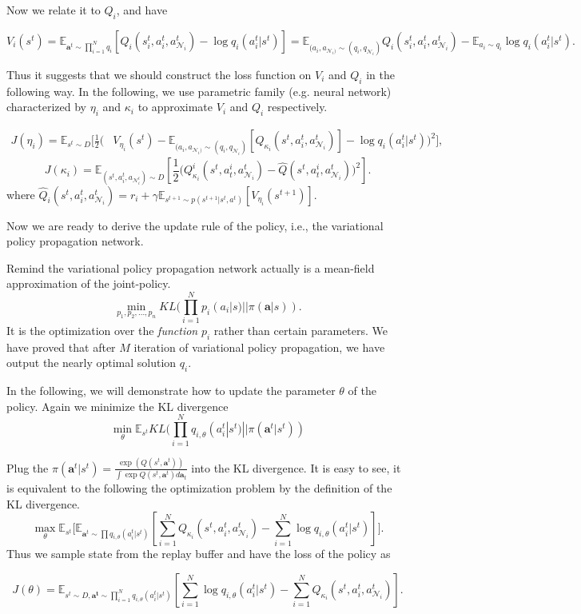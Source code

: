 \documentclass[11pt,a4paper]{article}
\theoremstyle{definition}
\begin{document}
Now we relate it to  $Q_i$, and have

$$V_i(s^t)=\mathbb{E}_{\mathbf{a}^t\sim\prod_{i=1}^{N} q_i} [Q_i(s_i^t,a_i^t,a_{\mathcal{N}_i}^t)-\log q_i(a_i^t|s^t)]=\mathbb{E}_{(a_i,a_{\mathcal{N}_i)}\sim (q_i,q _{\mathcal{N}_i}) } Q_i(s_i^t,a_i^t,a_{\mathcal{N}_i}^t)-\mathbb{E}_{a_i\sim q_i}\log q_i(a_i^t|s^t).$$

Thus it suggests that we should construct the loss function on $V_i $ and $Q_i$ in the following way. In the following, we use parametric family (e.g. neural network) characterized by $\eta_i$ and $\kappa_i$ to approximate  $V_i$ and $Q_i$ respectively.

\begin{align*}
J(\eta_i)=\mathbb{E}_{s^t\sim D}[\frac{1}{2}\big(&V_{\eta_i}(s^t)-
\mathbb{E}_{(a_i,a_{\mathcal{N}_i)}\sim (q_i,q _{\mathcal{N}_i})}[Q_{\kappa_i}(s^t,a_i^t,a^t_{\mathcal{N}_i} )]-\log q_{i}(a_i^t|s^t)  \big)^2 ], 
\end{align*}
\begin{equation}
J(\kappa_i)=\mathbb{E}_{(s^t,a_i^t,a_{\mathcal{N}_i^t})\sim D} [\frac{1}{2}\big( Q^i_{\kappa_i}(s^t,a^i_t, a_{\mathcal{N}_i}^t)-\hat{Q}(s^t, a^i_t,a_{\mathcal{N}_i}^t) \big)^2].
\end{equation}
where $\hat{Q}_i(s^t,a_i^t, a^t_{\mathcal{N}_i})=r_i+\gamma \mathbb{E}_{s^{t+1}\sim p(s^{t+1}|s^t,a^t)}[V_{\eta_i}(s^{t+1})].$


Now we are ready to derive the update rule of the policy, i.e., the variational policy propagation network.

Remind the variational policy propagation network actually is a mean-field approximation of the joint-policy.
$$ \min_{p_1,p_2,...,p_n} KL(\prod_{i=1}^{N} p_i(a_i|s)|| \pi(\mathbf{a}|s) ).$$
It is the optimization over the \emph{function} $p_i$ rather than certain parameters. We have proved that  after $M$ iteration of variational policy propagation, we have output the nearly optimal solution $q_i$.

In the following, we will demonstrate how to update the parameter $\theta$ of the policy. Again we minimize the KL divergence
$$ \min_\theta \mathbb{E}_{s^t} KL( \prod_{i=1}^{N} q_{i,\theta} (a^t_i|s^t) || \pi(\mathbf{a}^t|s^t)  )  $$

Plug the $\pi(\mathbf{a}^t|s^t)=\frac{\exp(Q(s^t,\mathbf{a}^t))}{\int \exp Q(s^t,\mathbf{a}^t) d\mathbf{a}_t }$ into the KL divergence. It is easy to see, it is equivalent to the following the optimization problem by the definition of the KL divergence. 
$$\max_{\theta}\mathbb{E}_{s^t}\big[\mathbb{E}_{\mathbf{a}^t\sim \prod q_{i,\theta}(a_i^t|s^t)}[\sum_{i=1}^{N}Q_{\kappa_i}(s^t,a_i^t,a_{\mathcal{N}_i}^t)-\sum_{i=1}^N\log q_{i,\theta}(a_i^t|s^t)] \big].$$
Thus we sample state from the replay buffer and have the loss of the policy as

$$ J(\theta)= \mathbb{E}_{s^t\sim D, \mathbf{a^t}\sim \prod_{i=1}^N q_{i,\theta}(a_i^t|s^t)} [\sum_{i=1}^{N}\log q_{i,\theta}(a^t_i|s^t)-\sum_{i=1}^{N} Q_{\kappa_i}(s^t, a_i^t, a_{\mathcal{N}_i}^t) ].$$
	
\end{document}

